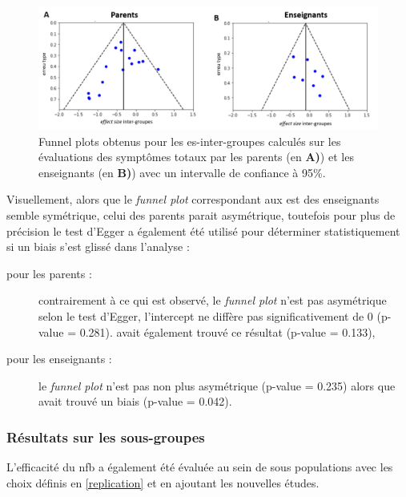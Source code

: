 \begin{figure}[h!]
  \centering
	\includegraphics[width=1\linewidth]{figures/chapter-2/meta-analysis-funnel-plots} 
  \caption{Funnel plots obtenus pour les \gls{es}-inter-groupes calculés sur les évaluations des symptômes totaux par les parents (en \textbf{A)}) et 
	les enseignants (en \textbf{B)}) avec un intervalle de confiance à 95\%.}
  \label{Figure:meta_analysis_funnel_plots}
\end{figure}

Visuellement, alors que le \textit{funnel plot} correspondant aux \gls{est} des enseignants semble symétrique, celui des parents parait asymétrique, 
toutefois pour plus de précision le test d'Egger a également été utilisé pour déterminer statistiquement si un biais s'est glissé dans l'analyse :
\begin{description}
\item[pour les parents :] contrairement à ce qui est observé, le \textit{funnel plot} n'est pas asymétrique selon le test d'Egger, l'intercept ne diffère pas 
significativement de 0 (p-value = 0.281). \citet{Cortese2016}
avait également trouvé ce résultat (p-value = 0.133),
\item[pour les enseignants :]  le \textit{funnel plot} n'est pas non plus asymétrique (p-value = 0.235) alors que \citet{Cortese2016} avait trouvé un biais
(p-value = 0.042).
\end{description}

\subsubsection{Résultats sur les sous-groupes}

L'efficacité du \gls{nfb} a également été évaluée au sein de sous populations \citep{Cortese2016} avec les choix définis en \ref{replication} et en ajoutant
les nouvelles études. 

